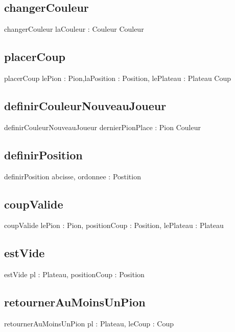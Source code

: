 	\subsection{changerCouleur}
		\begin{algorithme}
			\signaturefonction
				{changerCouleur}
				{laCouleur : Couleur}
				{Couleur}
		\end{algorithme}

	\subsection{placerCoup}
		\begin{algorithme}
			\signaturefonction
				{placerCoup}
				{lePion : Pion,laPosition : Position, lePlateau : Plateau}
				{Coup}
		\end{algorithme}
	\subsection{definirCouleurNouveauJoueur}
		\begin{algorithme}
			\signaturefonction
				{definirCouleurNouveauJoueur}
				{dernierPionPlace : Pion}
				{Couleur}
		\end{algorithme}
	\subsection{definirPosition}
		\begin{algorithme}
			\signaturefonction
				{definirPosition}
				{abcisse, ordonnee : \caractere}
				{Postition}
		\end{algorithme}
	\subsection{coupValide}
		\begin{algorithme}
			\signaturefonction
				{coupValide}
				{lePion : Pion, positionCoup : Position, lePlateau : Plateau}
				{\booleen}
		\end{algorithme}
	\subsection{estVide}
		\begin{algorithme}
			\signaturefonction
				{estVide}
				{pl : Plateau, positionCoup : Position}
				{\booleen}
		\end{algorithme}
	\subsection{retournerAuMoinsUnPion}
		\begin{algorithme}
			\signaturefonction
				{retournerAuMoinsUnPion}
				{pl : Plateau, leCoup : Coup}
				{\booleen}
		\end{algorithme}
